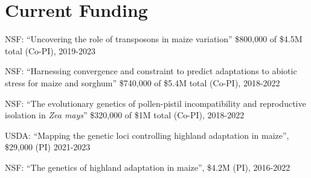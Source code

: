 \documentclass[letterpaper,10pt]{article}
\renewenvironment{itemize}{
  \begin{list}{}{
    \setlength{\leftmargin}{1.5em}
  }
}{
  \end{list}
}
\begin{document}
\section*{Current Funding}
\begin{itemize}
\setlength\itemsep{0ex}
 \item NSF: ``Uncovering the role of transposons in maize variation'' \$800,000 of \$4.5M total (Co-PI), 2019-2023%
 \item NSF: ``Harnessing convergence and constraint to predict adaptations to abiotic stress for maize and sorghum'' \$740,000 of \$5.4M total (Co-PI), 2018-2022
 \item NSF: ``The evolutionary genetics of pollen-pistil incompatibility and reproductive isolation in \textit{Zea mays}'' \$320,000 of \$1M total (Co-PI), 2018-2022
 \item USDA:
 ``Mapping the genetic loci controlling highland adaptation in maize'', \$29,000 (PI) 2021-2023
 \item NSF: ``The genetics of highland adaptation in maize'', \$4.2M (PI), 2016-2022

\end{itemize}
\end{document}
